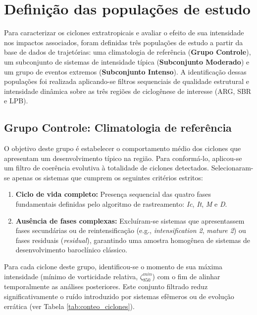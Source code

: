 \section{Definição das populações de estudo}\label{sec:poblaciones_estudio}
Para caracterizar os ciclones extratropicais e avaliar o efeito de sua intensidade nos impactos associados, foram definidas três populações de estudo a partir da base de dados de trajetórias: uma climatologia de referência (\textbf{Grupo Controle}), um subconjunto de sistemas de intensidade típica (\textbf{Subconjunto Moderado}) e um grupo de eventos extremos (\textbf{Subconjunto Intenso}). A identificação dessas populações foi realizada aplicando-se filtros sequenciais de qualidade estrutural e intensidade dinâmica sobre as três regiões de ciclogênese de interesse (ARG, SBR e LPB).

\subsection{Grupo Controle: Climatologia de referência}\label{subsec:grupo_control}
O objetivo deste grupo é estabelecer o comportamento médio dos ciclones que apresentam um desenvolvimento típico na região. Para conformá-lo, aplicou-se um filtro de coerência evolutiva à totalidade de ciclones detectados. Selecionaram-se apenas os sistemas que cumprem os seguintes critérios estritos:

\begin{enumerate}
    \item \textbf{Ciclo de vida completo:} Presença sequencial das quatro fases fundamentais definidas pelo algoritmo de rastreamento: \textit{Ic}, \textit{It}, \textit{M} e \textit{D}.
    \item \textbf{Ausência de fases complexas:} Excluíram-se sistemas que apresentassem fases secundárias ou de reintensificação (e.g., \textit{intensification 2}, \textit{mature 2}) ou fases residuais (\textit{residual}), garantindo uma amostra homogênea de sistemas de desenvolvimento baroclínico clássico.
\end{enumerate}

Para cada ciclone deste grupo, identificou-se o momento de sua máxima intensidade (mínimo de vorticidade relativa, $\zeta_{850}^{min}$) com o fim de alinhar temporalmente as análises posteriores. Este conjunto filtrado reduz significativamente o ruído introduzido por sistemas efêmeros ou de evolução errática (ver Tabela \ref{tab:conteo_ciclones}).

